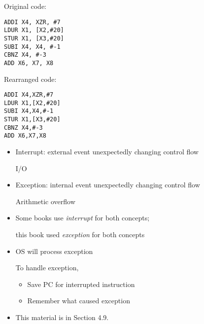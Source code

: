 \begin{frame}[fragile]

\begin{multicols}{2}

Original code:

\begin{verbatim}
ADDI X4, XZR, #7
LDUR X1, [X2,#20]
STUR X1, [X3,#20]
SUBI X4, X4, #-1
CBNZ X4, #-3
ADD X6, X7, X8
\end{verbatim}

\columnbreak

Rearranged code:

\begin{verbatim}
ADDI X4,XZR,#7
LDUR X1,[X2,#20]
SUBI X4,X4,#-1
STUR X1,[X3,#20]
CBNZ X4,#-3
ADD X6,X7,X8
\end{verbatim}
    
\end{multicols}


    
\end{frame}

\begin{frame}[fragile]
\begin{itemize}
\item Interrupt: external event unexpectedly changing control flow 

	I/O

\item Exception: internal event unexpectedly changing control flow

	Arithmetic overflow

\item Some books use {\it interrupt} for both concepts;

	this book used {\it exception} for both concepts

\item OS will process exception

To handle exception,
\begin{itemize}
	\item Save PC for interrupted instruction
	\item Remember what caused exception
\end{itemize}
\end{itemize}
\BNotes\ifnum{}
\begin{itemize}
\item This material is in Section 4.9.
\end{itemize}
\fi\ENotes
\end{frame}

